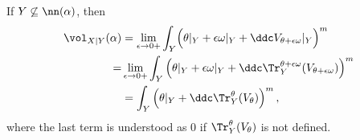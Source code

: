 




\begin{theorem}\label{thm:rest_volume_tr_volume} If $Y\not\subseteq \nn(\alpha)$, then
\begin{equation}\label{eq:non-nef_rest_vol}
\begin{aligned}
\vol_{X|Y}(\alpha) &= \lim_{\epsilon \to 0+}\int_Y \Bigl(\theta|_Y + \epsilon \omega|_Y +  \ddc V_{\theta+ \epsilon \omega}|_Y\Bigr)^m\\
=&\lim_{\epsilon \to 0+}\int_Y \left(\theta|_Y + \epsilon \omega|_Y +  \ddc \Tr_Y^{\theta+ \epsilon \omega}(V_{\theta+ \epsilon \omega}) \right)^m \\
&=\int_Y \left( \theta|_Y+\ddc \Tr_Y^{\theta}(V_{\theta}) \right)^m,
\end{aligned}
\end{equation}
where the last term is understood as $0$ if $\Tr_Y^{\theta}(V_{\theta})$ is not defined.
\end{theorem}

